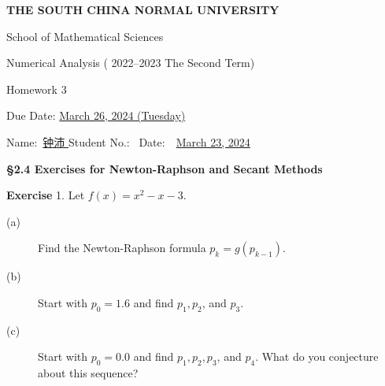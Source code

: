 \documentclass[UTF8,12pt,hyperref]{ctexart}
\makeatletter
\newenvironment{exercise}[1][{\color{blue}\bf Exercise}]%
{%
 \begin{center}   \begin{lrbox}{\@tempboxa}%
    \begin{minipage}{\textwidth}%
  {\color{blue}\bfseries
#1}   }{%
    \end{minipage}%
    \end{lrbox}
    \colorbox{green}{\noindent\usebox{\@tempboxa}} \end{center}  
}
\makeatother
\begin{document}

\begin{center}
{\bf  THE SOUTH CHINA NORMAL UNIVERSITY\vspace{0.08cm}

School of Mathematical Sciences\vspace{0.08cm}
 
Numerical Analysis ( 2022--2023 The Second Term) \vspace{0.18cm}

{\Large Homework 3}\vspace{0.18cm}

Due Date: \underline{March 26, 2024 (Tuesday)} }
\end{center}\vspace{-0.16cm}

\begin{center}
  Name:\ \underline{\qquad 钟沛 \hspace{1cm}}\hspace{0.298cm}  
  Student No.:\ \underline{\hspace{1cm}} 
  Date:\ \ \underline{March 23, 2024} 
   \end{center}

 

\begin{center}  \bf \Large
{\S 2.4 Exercises for Newton-Raphson and Secant Methods}
\end{center} 
  
\begin{exercise}1. \quad 
 Let $f(x) = x^2-x-3$. 
\begin{description}
\item[(a)] Find the Newton-Raphson formula $p_k = g (p_{k-1})$. 
\item[(b)] Start with $p_0 = 1.6$ and find $p_1, p_2$, and $p_3$. 
\item[(c)] Start with $p_0 = 0.0$ and find $p_1, p_2, p_3$, and $p_4$. What do you conjecture about this sequence?
\end{description}
 \end{exercise}
  
\end{document}
